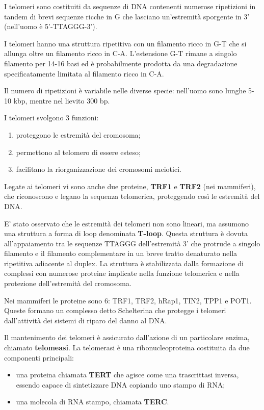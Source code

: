 \documentclass[]{article}
\begin{document}
I telomeri sono costituiti da sequenze di DNA contenenti numerose
ripetizioni in tandem di brevi sequenze ricche in G che lasciano
un'estremità sporgente in 3' (nell'uomo è 5'-TTAGGG-3').

I telomeri hanno una struttura ripetitiva con un filamento ricco in G-T
che si allunga oltre un filamento ricco in C-A. L'estensione G-T rimane
a singolo filamento per 14-16 basi ed è probabilmente prodotta da una
degradazione specificatamente limitata al filamento ricco in C-A.

Il numero di ripetizioni è variabile nelle diverse specie: nell'uomo
sono lunghe 5-10 kbp, mentre nel lievito 300 bp.

I telomeri svolgono 3 funzioni:

\begin{enumerate}
\def\labelenumi{\arabic{enumi}.}
\itemsep1pt\parskip0pt
\item
  proteggono le estremità del cromosoma;
\item
  permettono al telomero di essere esteso;
\item
  facilitano la riorganizzazione dei cromosomi meiotici.
\end{enumerate}

Legate ai telomeri vi sono anche due proteine, \textbf{TRF1} e
\textbf{TRF2} (nei mammiferi), che riconoscono e legano la sequenza
telomerica, proteggendo così le estremità del DNA.

E' stato osservato che le estremità dei telomeri non sono lineari, ma
assumono una struttura a forma di loop denominata \textbf{T-loop}.
Questa struttura è dovuta all'appaiamento tra le sequenze TTAGGG
dell'estremità 3' che protrude a singolo filamento e il filamento
complementare in un breve tratto denaturato nella ripetitiva adiacente
al duplex. La struttura è stabilizzata dalla formazione di complessi con
numerose proteine implicate nella funzione telomerica e nella protezione
dell'estremità del cromosoma.

Nei mammiferi le proteine sono 6: TRF1, TRF2, hRap1, TIN2, TPP1 e POT1.
Queste formano un complesso detto Schelterina che protegge i telomeri
dall'attività dei sistemi di riparo del danno al DNA.

Il mantenimento dei telomeri è assicurato dall'azione di un particolare
enzima, chiamato \textbf{telomeasi}. La telomerasi è una
ribonucleoproteina costituita da due componenti principali:

\begin{itemize}
\itemsep1pt\parskip0pt
\item
  una proteina chiamata \textbf{TERT} che agisce come una trascrittasi
  inversa, essendo capace di sintetizzare DNA copiando uno stampo di
  RNA;
\item
  una molecola di RNA stampo, chiamata \textbf{TERC}.
\end{itemize}
\end{document}
